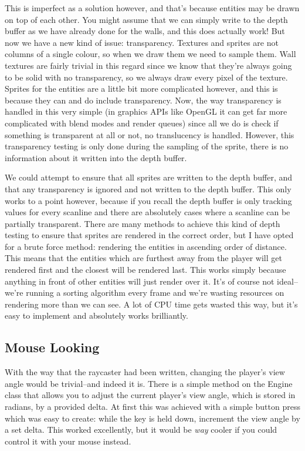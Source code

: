 \documentclass{article}
\begin{document}
This is imperfect as a solution however, and that's because entities may be
drawn on top of each other. You might assume that we can simply write to the
depth buffer as we have already done for the walls, and this does actually work!
But now we have a new kind of issue: transparency. Textures and sprites are not 
columns of a single colour, so when we draw them we need to sample them. Wall
textures are fairly trivial in this regard since we know that they're always
going to be solid with no transparency, so we always draw every pixel of the
texture. Sprites for the entities are a little bit more complicated however, and
this is because they can and do include transparency. Now, the way transparency
is handled in this very simple (in graphics APIs like OpenGL it can get far more
complicated with blend modes and render queues) since all we do is check if
something is transparent at all or not, no translucency is handled. However,
this transparency testing is only done during the sampling of the sprite, there
is no information about it written into the depth buffer.

We could attempt to ensure that all sprites are written to the depth buffer, and
that any transparency is ignored and not written to the depth buffer. This only
works to a point however, because if you recall the depth buffer is only
tracking values for every scanline and there are absolutely cases where a
scanline can be partially transparent. There are many methods to achieve this
kind of depth testing to ensure that sprites are rendered in the correct order,
but I have opted for a brute force method: rendering the entities in ascending
order of distance. This means that the entities which are furthest away from the
player will get rendered first and the closest will be rendered last. This works
simply because anything in front of other entities will just render over it.
It's of course not ideal--we're running a sorting algorithm every frame and
we're wasting resources on rendering more than we can see. A lot of CPU time
gets wasted this way, but it's easy to implement and absolutely works
brilliantly.

\subsection{Mouse Looking}
With the way that the raycaster had been written, changing the player's view
angle would be trivial--and indeed it is. There is a simple method on the Engine
class that allows you to adjust the current player's view angle, which is stored
in radians, by a provided delta. At first this was achieved with a simple button
press which was easy to create: while the key is held down, increment the view
angle by a set delta. This worked excellently, but it would be \textit{way}
cooler if you could control it with your mouse instead.
\end{document}
